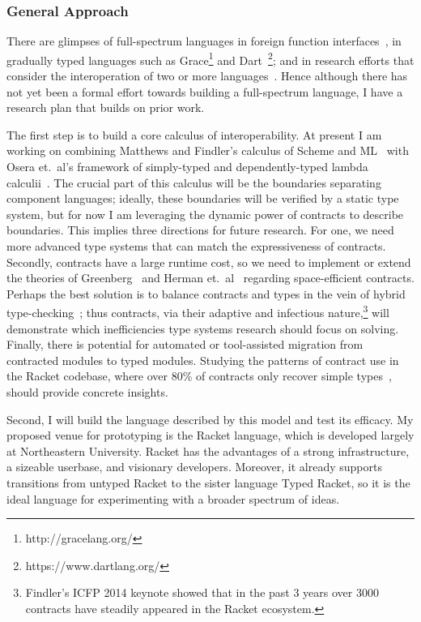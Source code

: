 \documentclass[12pt]{article}
\begin{document}
\vspace{-0.2cm}
\subsubsection*{General Approach}
There are glimpses of full-spectrum languages in foreign function interfaces~\cite{furr2005checking}, in gradually typed languages such as Grace\footnote{http://gracelang.org/} and Dart~\footnote{https://www.dartlang.org/}; and in research efforts that consider the interoperation of two or more languages~\cite{osera, gray2005fine, anand2014towards, perconti2014verifying}.
Hence although there has not yet been a formal effort towards building a full-spectrum language, I have a research plan that builds on prior work.

The first step is to build a core calculus of interoperability.
At present I am working on combining Matthews and Findler's calculus of Scheme and ML~\cite{matthews2007operational} with Osera et.~al's framework of simply-typed and dependently-typed lambda calculii~\cite{osera}.
The crucial part of this calculus will be the boundaries separating component languages; ideally, these boundaries will be verified by a static type system, but for now I am leveraging the dynamic power of contracts to describe boundaries.
This implies three directions for future research.
For one, we need more advanced type systems that can match the expressiveness of contracts.
Secondly, contracts have a large runtime cost, so we need to implement or extend the theories of Greenberg~\cite{greenberg2015space} and Herman et.~al~\cite{herman2010space} regarding space-efficient contracts.
Perhaps the best solution is to balance contracts and types in the vein of hybrid type-checking~\cite{knowles}; thus contracts, via their adaptive and infectious nature,\footnote{Findler's ICFP 2014 keynote showed that in the past 3 years over 3000 contracts have steadily appeared in the Racket ecosystem.} will demonstrate which inefficiencies type systems research should focus on solving.
Finally, there is potential for automated or tool-assisted migration from contracted modules to typed modules.
Studying the patterns of contract use in the Racket codebase, where over 80\% of contracts only recover simple types~\cite{greenberg2013manifest}, should provide concrete insights.

Second, I will build the language described by this model and test its efficacy.
My proposed venue for prototyping is the Racket language, which is developed largely at Northeastern University.
Racket has the advantages of a strong infrastructure, a sizeable userbase, and visionary developers.
Moreover, it already supports transitions from untyped Racket to the sister language Typed Racket, so it is the ideal language for experimenting with a broader spectrum of ideas.
\end{document}
